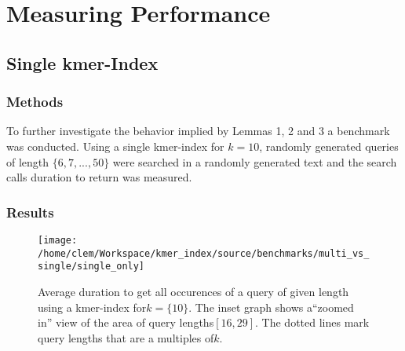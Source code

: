 \chapter{Measuring Performance}
\section{Single kmer-Index}
\subsection{Methods}

To further investigate the behavior implied by Lemmas 1, 2 and 3 a benchmark was conducted.
Using a single kmer-index for $k=10$, randomly generated queries of length $\{6,7,...,50\}$ were searched in a
randomly generated text and the search calls duration to return was measured.

\subsection{Results}

\begin{figure}[H]
\texttt{[image: /home/clem/Workspace/kmer\_index/source/benchmarks/multi\_vs\_single/single\_only]}

\caption{\label{figure 1}Average duration to get all occurences of a query
of given length using a kmer-index for$k=\{10\}$. The inset graph
shows a``zoomed in'' view of the area of query lengths$[16,29]$.
The dotted lines mark query lengths that are a multiples of$k$.}

\end{figure}